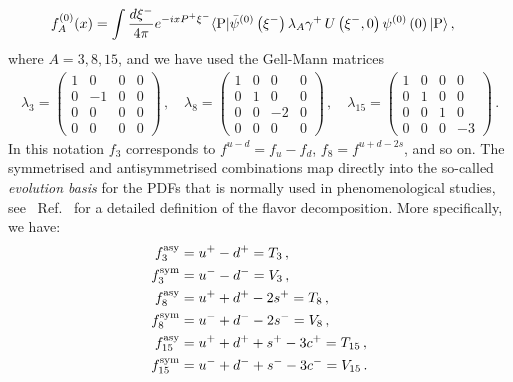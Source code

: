 \begin{eqnarray}
    \label{eq:fADef}
    f_A^{(0)}(x) &= \int \frac{d\xi^-}{4\pi} e^{-ixP^+\xi^-} 
	\langle \text{P}|\bar{\psi}^{(0)}\left(\xi^-\right) \lambda_A \gamma^+ \,   
	U\left(\xi^-,0\right) \psi^{(0)}\left( 0\right)  |\text{P}\rangle\, , 
\end{eqnarray}
where $A=3,8,15$, and we have used the Gell-Mann matrices
\begin{eqnarray}
    \lambda_3=
    \begin{pmatrix}
        1 & 0 & 0 & 0\\
        0 & -1& 0 & 0\\
        0 & 0 & 0 & 0\\
        0 & 0 & 0 & 0
    \end{pmatrix}\, , \quad
    \lambda_8=
    \begin{pmatrix}
        1 & 0 & 0 & 0\\
        0 & 1& 0 & 0\\
        0 & 0 & -2 & 0\\
        0 & 0 & 0 & 0
    \end{pmatrix}\, , \quad
    \lambda_{15}=
    \begin{pmatrix}
        1 & 0 & 0 & 0\\
        0 & 1& 0 & 0\\
        0 & 0 & 1 & 0\\
        0 & 0 & 0 & -3
    \end{pmatrix}\, . 
\end{eqnarray}
In this notation $f_3$ corresponds to $f^{u-d}=f_u-f_d$, $f_8=f^{u+d-2s}$, and
so on. The symmetrised and antisymmetrised combinations map directly into the
so-called {\em evolution basis} for the PDFs that is normally used in
phenomenological studies, see \eg\ Ref.~\cite{Vogt:2004ns} for a detailed
definition of the flavor decomposition. More specifically, we have:
\begin{align}
    f^{\mathrm{asy}}_{3}  &= u^+ - d^+ = T_3 \, , \\
    f^{\mathrm{sym}}_{3}  &= u^- - d^- = V_3 \, , \\
    f^{\mathrm{asy}}_{8}  &= u^+ + d^+ - 2 s^+ = T_8 \, , \\
    f^{\mathrm{sym}}_{8}  &= u^- + d^- - 2 s^- = V_8 \, , \\
    f^{\mathrm{asy}}_{15} &= u^+ + d^+ + s^+ - 3 c^+ = T_{15} \, , \\
    f^{\mathrm{sym}}_{15} &= u^- + d^- + s^- - 3 c^- = V_{15} \, .
\end{align}

